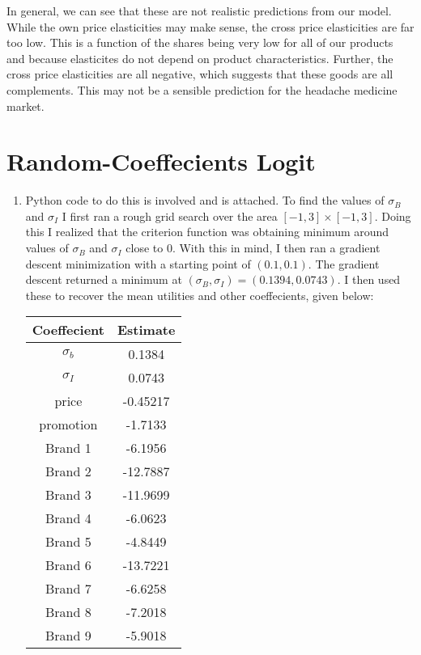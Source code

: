 \documentclass[10pt]{article}
\begin{document}
\begin{enumerate}
  In general, we can see that these are not realistic predictions from our model. While the own price elasticities may make sense, the cross price elasticities are far too low. This is a function of the shares being very low for all of our products and because elasticites do not depend on product characteristics. Further, the cross price elasticities are all negative, which suggests that these goods are all complements. This may not be a sensible prediction for the headache medicine market.
\end{enumerate}

\section{Random-Coeffecients Logit}

\begin{enumerate}
  \item Python code to do this is involved and is attached. To find the values of $\sigma_B$ and $\sigma_I$ I first ran a rough grid search over the area $[-1, 3] \times [-1, 3]$. Doing this I realized that the criterion function was obtaining minimum around values of $\sigma_B$ and $\sigma_I$ close to 0. With this in mind, I then ran a gradient descent minimization with a starting point of $(0.1,0.1)$. The gradient descent returned a minimum at $(\sigma_B, \sigma_I) = (0.1394, 0.0743)$. I then used these to recover the mean utilities and other coeffecients, given below:
  \begin{table}[!htb]
  \begin{center}
  \begin{tabular}{|c| c|}
      \hline
      Coeffecient & Estimate \\
      \hline
      $\sigma_b$ & 0.1384 \\
      $\sigma_I$ & 0.0743 \\
      price & -0.45217 \\
      promotion & -1.7133 \\
      Brand 1 & -6.1956\\
      Brand 2 & -12.7887 \\
      Brand 3 & -11.9699 \\
      Brand 4 & -6.0623\\
      Brand 5 &  -4.8449 \\
      Brand 6 &  -13.7221\\
      Brand 7 & -6.6258 \\
      Brand 8 & -7.2018\\
      Brand 9 & -5.9018\\

\end{tabular}
\end{center}
\end{table}
\end{enumerate}
\end{document}
